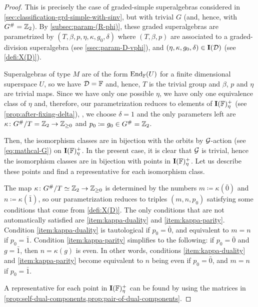 \begin{proof}
    This is precisely the case of graded-simple superalgebras considered in \cref{sec:classification-grd-simple-with-sinv}, but with trivial $G$ (and, hence, with $G^\# = \mathbb{Z}_2$). 
    By \cref{subsec:param-(R-phi)}, these graded superalgebras are parametrized by $(T, \beta, p, \eta, \kappa, g_0, \delta)$ where $(T, \beta, p)$ are associated to a graded-division superalgebra (see \cref{ssec:param-D-vphi}), and $(\eta, \kappa, g_0, \delta) \in \mathbf{I}(\mathcal{D})$ (see \cref{defi:X(D)}). 
    
    Superalgebras of type $M$ are of the form $\operatorname{End}_{\mathbb{F}} (U)$ for a finite dimensional superspace $U$, so we have $\mathcal{D} = \mathbb{F}$ and, hence, $T$ is the trivial group and $\beta$, $p$ and $\eta$ are trivial maps. 
    Since we have only one possible $\eta$, we have only one equivalence class of $\eta$ and, therefore, our parametrization reduces to elements of $\mathbf{I}(\mathbb{F})_\eta^+$ (see \cref{prop:after-fixing-delta}), \ie, we choose $\delta = 1$ and the only parameters left are $\kappa\colon G^\#/T = \mathbb{Z}_2 \to \mathbb{Z}_{\geq 0}$ and $p_0 \coloneqq g_0 \in G^\# = \mathbb{Z}_2$. 
    
    Then, the isomorphism classes are in bijection with the orbits by $\mathcal G$-action (see \cref{eq:mathcal-G}) on $\mathbf{I}(\mathbb{F})_\eta^+$. 
    In the present case, it is clear that $\mathcal G$ is trivial, hence the isomorphism classes are in bijection with points in $\mathbf{I}(\mathbb{F})_\eta^+$. 
    Let us describe these points and find a representative for each isomorphism class. 
    
    The map $\kappa\colon G^\#/T \simeq \mathbb{Z}_2 \to \mathbb{Z}_{\geq 0}$ is determined by the numbers $m \coloneqq \kappa(\bar 0)$ and $n \coloneqq \kappa(\bar 1)$, so our parametrization reduces to triples $(m,n,p_0)$ satisfying some conditions that come from \cref{defi:X(D)}. 
    The only conditions that are not automatically satisfied are \eqref{item:kappa-duality} and \eqref{item:kappa-parity}. 
    Condition \eqref{item:kappa-duality} is tautological if $p_0 = \bar 0$, and equivalent to $m=n$ if $p_0 = \bar 1$. 
    Condition \eqref{item:kappa-parity} simplifies to the following: if $p_0 = \bar 0$ and $g = \bar 1$, then $n = \kappa (g)$ is even. 
    In other words, conditions \eqref{item:kappa-duality} and \eqref{item:kappa-parity} become equivalent to $n$ being even if $p_0 = \bar 0$, and $m = n$ if $p_0= \bar 1$. 
    
    A representative for each point in $\mathbf{I}(\mathbb{F})_\eta^+$ can be found by using the matrices in \cref{prop:self-dual-components,prop:pair-of-dual-components}. 
\end{proof}